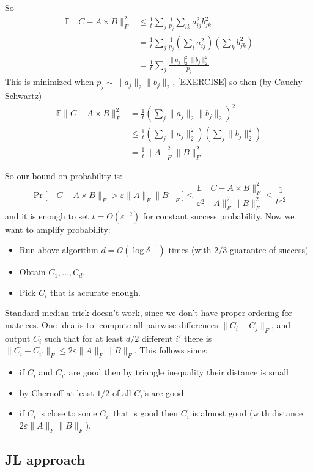 \documentclass[11pt]{article}
\newcommand{\E}{{\mathbb E}}
\newcommand{\bigo}{\mathcal{O}}
\begin{document}
So
\begin{align*}
\E \| C - A \times B\|_F^2 &\le \frac{1}{t} \sum_j \frac{1}{p_j} \sum_{ik} a^2_{ij}b^2_{jk}\\
&=\frac{1}{t} \sum_j \frac{1}{p_j} \left(\sum_{i} a^2_{ij}\right)\left(\sum_k b^2_{jk}\right) \\
&=\frac{1}{t} \sum_j \frac{ \|a_j\|^2_2 \|b_j\|^2_2}{p_j} 
\end{align*}
This is minimized when $p_j \sim \|a_j\|_2 \|b_j\|_2$, [EXERCISE] so then (by Cauchy-Schwartz)
\begin{align*}
\E \| C - A \times B\|_F^2 &= \frac{1}{t} \left(\sum_j \|a_j\|_2 \|b_j\|_2\right)^2\\
&\le \frac{1}{t} \left(\sum_j \|a_j\|_2^2\right)\left(\sum_j \|b_j\|_2^2\right)\\
&= \frac{1}{t} \|A\|_F^2 \|B\|_F^2
\end{align*}

So our bound on probability is:
$$\Pr\Big[\| C - A \times B\|_F > \varepsilon \|A\|_F \|B\|_F\Big] \le \frac{\E \| C - A \times B\|_F^2}{ \varepsilon^2 \|A\|_F^2 \|B\|_F^2 }  \le \frac{1}{t \varepsilon^2}$$
and it is enough to set $t = \Theta(\varepsilon^{-2})$ for constant success probability.
Now we want to amplify probability:
\begin{itemize}
\item Run above algorithm $d = \bigo( \log \delta^{-1})$ times (with $2/3$ guarantee of success)
\item Obtain $C_1, \ldots, C_d$.
\item Pick $C_i$ that is accurate enough.
\end{itemize}

Standard median trick doesn't work, since we don't have proper ordering for matrices.
One idea is to: compute all pairwise differences $\|C_i - C_j\|_F$, and output $C_i$ such that for at least $d/2$ different $i'$ there is $\|C_{i} - C_{i'}\|_F \le 2 \varepsilon \|A\|_F \|B\|_F$. This follows since:
\begin{itemize}
\item if $C_i$ and $C_{i'}$ are good then by triangle inequality their distance is small
\item by Chernoff at least $1/2$ of all $C_i$'s are good
\item if $C_i$ is close to some $C_{i'}$ that is good then $C_i$ is almost good (with distance $2\varepsilon \|A\|_F \|B\|_F$).
\end{itemize}

\subsection{JL approach}
\end{document}
